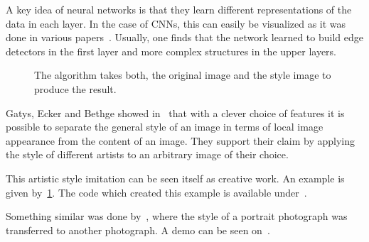 \documentclass[technote,a4paper,leqno]{IEEEtran}
\begin{document}
A key idea of neural networks is that they learn different representations of
the data in each layer. In the case of \glspl{CNN}, this can easily be
visualized as it was done in various papers~\cite{zeiler2014visualizing}.
Usually, one finds that the network learned to build edge detectors in the
first layer and more complex structures in the upper layers.

\begin{figure}
\centering
{}%

\caption{The algorithm takes both, the original image and the style image  to produce the result.}
\label{fig:neural-style}
\end{figure}

Gatys, Ecker and Bethge showed in~\cite{gatys2015neural} that with a clever
choice of features it is possible to separate the general style of an image in
terms of local image appearance from the content of an image. They support
their claim by applying the style of different artists to an arbitrary image of
their choice.

This artistic style imitation can be seen itself as creative work. An example
is given by~\cref{fig:neural-style}. The code which created this example is
available under~\cite{Johnson2016}.

Something similar was done by~\cite{shih2014style}, where the style of a
portrait photograph was transferred to another photograph. A demo can be seen
on~\cite{Shih2014}.
\end{document}
